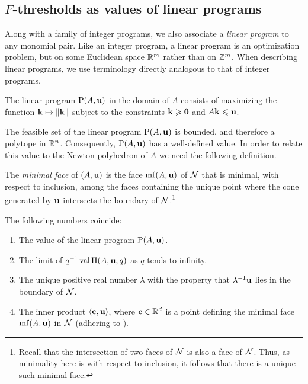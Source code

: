 \documentclass[11pt]{amsart}
\begin{document}
\subsection{$F$-thresholds as values of linear programs}
Along with a family of integer programs, we also associate a \emph{linear program} to any monomial pair.
Like an integer program, a linear program is an optimization problem, but on some Euclidean space $\mathbb{R}^m$ rather than on $\mathbb{Z}^m$.
When describing linear programs, we use terminology directly analogous to that of integer programs.

\begin{definition}
   The linear program $\mathrm{P}(A, \mathbf{u})$ in the domain of $A$ consists of maximizing the function $\mathbf{k} \mapsto \| \mathbf{k} \|$ subject to the constraints $\mathbf{k} \geqslant \mathbf{0}$ and $A \mathbf{k} \leqslant \mathbf{u}$.
\end{definition}

The feasible set of the linear program $\mathrm{P}(A,\mathbf{u})$ is bounded, and therefore a polytope in $\mathbb{R}^n$.
Consequently, $\mathrm{P}(A,\mathbf{u})$ has a well-defined value.
In order to relate this value to the Newton polyhedron of $A$ we need the following definition.

\begin{definition}
   The \emph{minimal face} of $(A, \mathbf{u})$ is the face $\operatorname{mf}(A, \mathbf{u})$ of $\mathcal{N}$ that is minimal, with respect to inclusion, among the faces containing the unique point where the cone generated by $\mathbf{u}$ intersects the boundary of $\mathcal{N}$.\footnote{Recall that the intersection of two faces of $\mathcal{N}$ is also a face of $\mathcal{N}$. Thus, as minimality here is with respect to inclusion, it follows that there is a unique such minimal face.}
\end{definition}

\begin{proposition}
   \label{FT descriptions: P}
   The following numbers coincide\textup:
   \begin{enumerate}
      \item\label{value} The value of the linear program $\mathrm{P}(A, \mathbf{u})$.
      \item\label{limit} The limit of $q^{-1}\operatorname{val} \Pi(A,\mathbf{u},q)$ as $q$ tends to infinity.
      \item\label{lambda} The unique positive real number $\lambda$ with the property that $\lambda^{-1}\mathbf{u}$ lies in the boundary of $\mathcal{N}$.
      \item\label{new ip} The inner product $\langle \mathbf{c}, \mathbf{u} \rangle$, where $\mathbf{c} \in \mathbb{R}^d$ is a point defining the minimal face $\operatorname{mf}(A, \mathbf{u})$ in $\mathcal{N}$ \textup(adhering to \textup).
   \end{enumerate}
\end{proposition}
\end{document}
